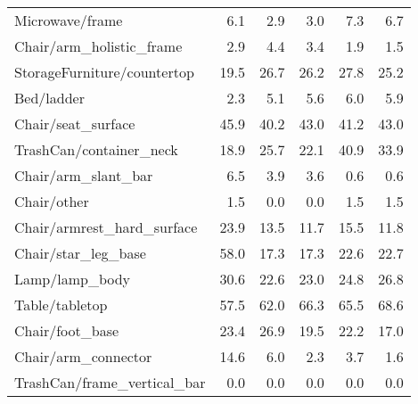 \begin{table}[!h]
\begin{tabular}{lrrrrr}
Microwave/frame                &            6.1 &             2.9 &                     3.0 &           7.3 &                   6.7 \\
Chair/arm\_holistic\_frame       &            2.9 &             4.4 &                     3.4 &           1.9 &                   1.5 \\
StorageFurniture/countertop    &           19.5 &            26.7 &                    26.2 &          27.8 &                  25.2 \\
Bed/ladder                     &            2.3 &             5.1 &                     5.6 &           6.0 &                   5.9 \\
Chair/seat\_surface             &           45.9 &            40.2 &                    43.0 &          41.2 &                  43.0 \\
TrashCan/container\_neck        &           18.9 &            25.7 &                    22.1 &          40.9 &                  33.9 \\
Chair/arm\_slant\_bar            &            6.5 &             3.9 &                     3.6 &           0.6 &                   0.6 \\
Chair/other                    &            1.5 &             0.0 &                     0.0 &           1.5 &                   1.5 \\
Chair/armrest\_hard\_surface     &           23.9 &            13.5 &                    11.7 &          15.5 &                  11.8 \\
Chair/star\_leg\_base            &           58.0 &            17.3 &                    17.3 &          22.6 &                  22.7 \\
Lamp/lamp\_body                 &           30.6 &            22.6 &                    23.0 &          24.8 &                  26.8 \\
Table/tabletop                 &           57.5 &            62.0 &                    66.3 &          65.5 &                  68.6 \\
Chair/foot\_base                &           23.4 &            26.9 &                    19.5 &          22.2 &                  17.0 \\
Chair/arm\_connector            &           14.6 &             6.0 &                     2.3 &           3.7 &                   1.6 \\
TrashCan/frame\_vertical\_bar    &            0.0 &             0.0 &                     0.0 &           0.0 &                   0.0 \\

\end{tabular}
\end{table}
